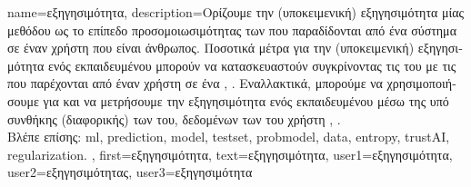 {name={\foreignlanguage{greek}{εξηγησιμότητα}},
	description={\foreignlanguage{greek}{Ορίζουμε την (υποκειμενική) εξηγησιμότητα μίας μεθόδου} 
		 \foreignlanguage{greek}{ως το επίπεδο προσομοιωσιμότητας} \cite{Colin:2022aa} \foreignlanguage{greek}{των} 
		 \foreignlanguage{greek}{που παραδίδονται από ένα σύστημα}  \foreignlanguage{greek}{σε 
		έναν χρήστη που είναι άνθρωπος. Ποσοτικά μέτρα για την (υποκειμενική) εξηγησιμότητα ενός εκπαιδευμένου} 
		 \foreignlanguage{greek}{μπορούν να κατασκευαστούν συγκρίνοντας τις}  
		 \foreignlanguage{greek}{του με τις}  \foreignlanguage{greek}{που 
		παρέχονται από έναν χρήστη σε ένα}  \cite{Zhang:2024aa}, \cite{Colin:2022aa}. 
		\foreignlanguage{greek}{Εναλλακτικά, μπορούμε να χρησιμοποιήσουμε}  
		\foreignlanguage{greek}{για}  \foreignlanguage{greek}{και να μετρήσουμε την εξηγησιμότητα ενός εκπαιδευμένου}  
		  \foreignlanguage{greek}{μέσω της υπό συνθήκης (διαφορικής)}  
		\foreignlanguage{greek}{των}  \foreignlanguage{greek}{του}, \foreignlanguage{greek}{δεδομένων των} 
		 \foreignlanguage{greek}{του χρήστη} \cite{JunXML2020}, \cite{Chen2018}. \\
		\foreignlanguage{greek}{Βλέπε επίσης:} \gls{ml}, \gls{prediction}, \gls{model}, \gls{testset}, \gls{probmodel}, \gls{data}, \gls{entropy}, \gls{trustAI}, \gls{regularization}. },
	first={\foreignlanguage{greek}{εξηγησιμότητα}},
	text={\foreignlanguage{greek}{εξηγησιμότητα}},
	user1={\foreignlanguage{greek}{εξηγησιμότητα}}, %
	user2={\foreignlanguage{greek}{εξηγησιμότητας}}, %
	user3={\foreignlanguage{greek}{εξηγησιμότητα}} %
}

